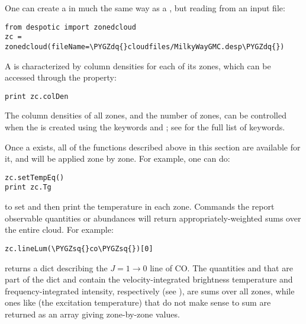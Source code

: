 \documentclass[letterpaper,10pt,english]{sphinxmanual}
\def\PYGZsq{\char`\'}
\def\PYGZdq{\char`\"}
\renewcommand\PYGZsq{\textquotesingle}
\begin{document}
One can create a  in much the same way as a ,
but reading from an input file:

\begin{Verbatim}[commandchars=\\\{\}]
from despotic import zonedcloud
zc = zonedcloud(fileName=\PYGZdq{}cloudfiles/MilkyWayGMC.desp\PYGZdq{})
\end{Verbatim}

A  is characterized by column densities for each of its
zones, which can be accessed through the  property:

\begin{Verbatim}[commandchars=\\\{\}]
print zc.colDen
\end{Verbatim}

The column densities of all zones, and the number of zones, can be
controlled when the  is created using the keywords
 and ; see {\hyperref[fulldoc:sssec-full-zonedcloud]{\emph{}}} for the
full list of keywords.

Once a  exists, all of the functions described above in
this section are available for it, and will be applied zone by
zone. For example, one can do:

\begin{Verbatim}[commandchars=\\\{\}]
zc.setTempEq()
print zc.Tg
\end{Verbatim}

to set and then print the temperature in each zone. Commands the
report observable quantities or abundances will return
appropriately-weighted sums over the entire cloud. For example:

\begin{Verbatim}[commandchars=\\\{\}]
zc.lineLum(\PYGZsq{}co\PYGZsq{})[0]
\end{Verbatim}

returns a dict describing the \(J=1\rightarrow 0\) line of CO. The
quantities  and  that are part of the dict
and contain the velocity-integrated brightness temperature and
frequency-integrated intensity, respectively (see
{\hyperref[functions:ssec-line-emission]{\emph{}}}), are sums over all zones, while ones
like  (the excitation temperature) that do not make sense to
sum are returned as an array giving zone-by-zone values.
\end{document}
